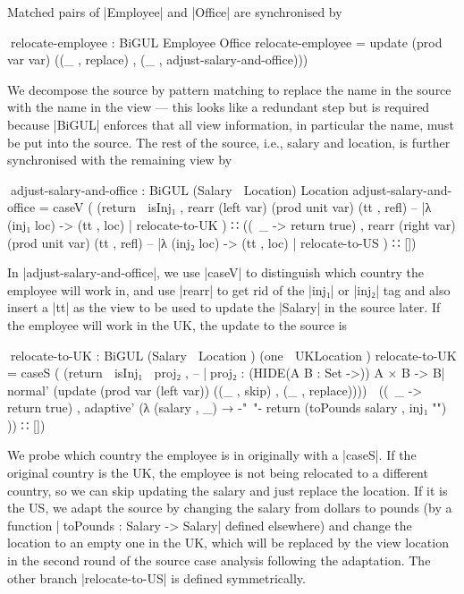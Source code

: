 \documentclass{sigplanconf}
\begin{document}
Matched pairs of |Employee| and |Office| are synchronised by
\begin{code}
^^^relocate-employee : BiGUL Employee Office
relocate-employee =
  update  (prod   var              var)
          ((_ ,   replace) , (_ ,  adjust-salary-and-office)))
\end{code}
We decompose the source by pattern matching to replace the name in the source with the name in the view --- this looks like a redundant step but is required because |BiGUL| enforces that all view information, in particular the name, must be put into the source.
The rest of the source, i.e., salary and location, is further synchronised with the remaining view by
\begin{code}
^^^adjust-salary-and-office : BiGUL (Salary  ⊗ Location) Location
adjust-salary-and-office =
  caseV (  (return ∘ isInj₁ ,
             rearr  (left   var) (prod unit var) (tt , refl)
                      -- |λ { (inj₁ loc) -> (tt , loc) }|
                    relocate-to-UK  ) ∷
           ((\ _ -> return true) ,
             rearr  (right  var) (prod unit var) (tt , refl)
                      -- |λ { (inj₂ loc) -> (tt , loc) }|
                    relocate-to-US  ) ∷ [])
\end{code}
In |adjust-salary-and-office|, we use |caseV| to distinguish which country the employee will work in, and use |rearr| to get rid of the |inj₁| or |inj₂| tag and also insert a |tt| as the view to be used to update the |Salary| in the source later.
If the employee will work in the UK, the update to the source is
\begin{code}
^^^relocate-to-UK : BiGUL  (Salary  ⊗ Location    )
                           (one     ⊗ UKLocation  )
relocate-to-UK = caseS
  (  (return ∘ isInj₁ ∘ proj₂ ,  -- |^^^proj₂ : (HIDE({A B : Set} ->)) A × B -> B|
       normal'    (update  (prod  var (left     var))
                           ((_ ,  skip) , (_ ,  replace)))) ∷
     ((\ _ -> return true) ,
       adaptive'  (λ {  (salary , _) →
                        {-"~"-} return (toPounds salary , inj₁ "") })) ∷ [])
\end{code}
We probe which country the employee is in originally with a |caseS|.
If the original country is the UK, the employee is not being relocated to a different country, so we can skip updating the salary and just replace the location.
If it is the US, we adapt the source by changing the salary from dollars to pounds (by a function |^^^toPounds : Salary -> Salary| defined elsewhere) and change the location to an empty one in the UK, which will be replaced by the view location in the second round of the source case analysis following the adaptation.
The other branch |relocate-to-US| is defined symmetrically.
\end{document}
